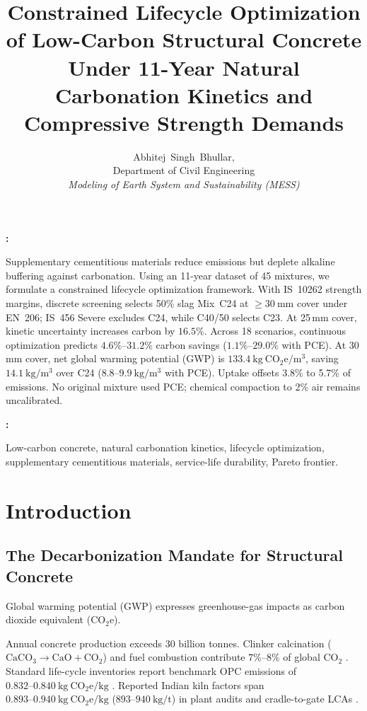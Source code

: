 \documentclass[journal]{IEEEtran}
\title{Constrained Lifecycle Optimization of Low-Carbon Structural Concrete Under 11-Year Natural Carbonation Kinetics and Compressive Strength Demands}
\author{Abhitej~Singh~Bhullar, \IEEEmembership{Roll No.~23110009}\\
Department of Civil Engineering\\
\textit{Modeling of Earth System and Sustainability (MESS)}%
}
\makeatletter
\renewenvironment{abstract}{%
  \if@twocolumn
    \normalfont\@IEEEabskeysecsize\textbf{\textit{\abstractname}:}\hspace{0.5em}%
  \else
    \bgroup\par\addvspace{0.5\baselineskip}\centering\@IEEEabskeysecsize\textbf{\abstractname}\par\addvspace{0.5\baselineskip}\egroup\quotation\@IEEEabskeysecsize\mdseries
  \fi\@IEEEgobbleleadPARNLSP
}{\relax\ifCLASSOPTIONtechnote\vspace{1.34ex}\else\vspace{0.67ex}\fi
  \par\if@twocolumn\else\endquotation\fi\normalfont\normalsize}
\renewenvironment{IEEEkeywords}{%
  \if@twocolumn
    \normalfont\@IEEEabskeysecsize\textbf{\textit{\IEEEkeywordsname}:}\hspace{0.5em}%
  \else
    \bgroup\par\addvspace{0.5\baselineskip}\centering\@IEEEabskeysecsize\textbf{\IEEEkeywordsname}\par\addvspace{0.5\baselineskip}\egroup\quotation\@IEEEabskeysecsize\mdseries
  \fi\@IEEEgobbleleadPARNLSP
}{\relax\ifCLASSOPTIONtechnote\vspace{1.34ex}\else\vspace{0.67ex}\fi
  \par\if@twocolumn\else\endquotation\fi\normalfont\normalsize}
\makeatother
\begin{document}
\maketitle

\begin{abstract}
Supplementary cementitious materials reduce emissions but deplete alkaline buffering against carbonation. Using an 11-year dataset of 45 mixtures, we formulate a constrained lifecycle optimization framework. With IS~10262 strength margins, discrete screening selects 50\% slag Mix~C24 at $\ge30\ \mathrm{mm}$ cover under EN~206; IS~456 Severe excludes C24, while C40/50 selects C23. At 25\,mm cover, kinetic uncertainty increases carbon by $16.5\%$. Across 18 scenarios, continuous optimization predicts $4.6\%\text{--}31.2\%$ carbon savings ($1.1\%\text{--}29.0\%$ with PCE). At 30\,mm cover, net global warming potential (GWP) is $133.4\ \mathrm{kg\ CO_2e/m^3}$, saving $14.1\ \mathrm{kg/m^3}$ over C24 ($8.8\text{--}9.9\ \mathrm{kg/m^3}$ with PCE). Uptake offsets 3.8\% to 5.7\% of emissions. No original mixture used PCE; chemical compaction to 2\% air remains uncalibrated.
\end{abstract}

\begin{IEEEkeywords}
Low-carbon concrete, natural carbonation kinetics, lifecycle optimization, supplementary cementitious materials, service-life durability, Pareto frontier.
\end{IEEEkeywords}

\section{Introduction}

\subsection{The Decarbonization Mandate for Structural Concrete}
Global warming potential (GWP) expresses greenhouse-gas impacts as carbon dioxide equivalent (CO$_2$e).

Annual concrete production exceeds 30 billion tonnes. Clinker calcination ($\mathrm{CaCO}_3 \to \mathrm{CaO} + \mathrm{CO}_2$) and fuel combustion contribute $7\%\text{--}8\%$ of global $\mathrm{CO}_2$ \cite{scrivener2018, monteiro2017}. Standard life-cycle inventories report benchmark OPC emissions of $0.832\text{--}0.840\ \mathrm{kg\ CO_2e/kg}$ \cite{ice3, scrivener2018}. Reported Indian kiln factors span $0.893\text{--}0.940\ \mathrm{kg\ CO_2e/kg}$ ($893\text{--}940\ \mathrm{kg/t}$) in plant audits and cradle-to-gate LCAs \cite{karadumpa2024}.
\end{document}
